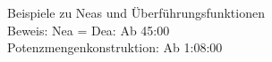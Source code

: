 \documentclass{article}
\begin{document}
Beispiele zu Neas und Überführungsfunktionen \\
Beweis: Nea = Dea: Ab 45:00 \\
Potenzmengenkonstruktion: Ab 1:08:00
\end{document}
